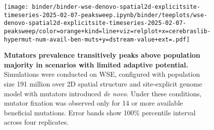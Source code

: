 \begin{figure}

\begin{minipage}{0.4\textwidth}
\texttt{[image: binder/binder-wse-denovo-spatial2d-explicitsite-timeseries-2025-02-07-peaksweep.ipynb/binder/teeplots/wse-denovo-spatial2d-explicitsite-timeseries-2025-02-07-peaksweep/color=orange+kind=line+viz=relplot+x=cerebraslib-hypermut-num-avail-ben-muts+y=dstream-value+ext=.pdf]}
\end{minipage}
\begin{minipage}{0.55\textwidth}
\caption{
\textbf{Mutators prevalence transitively peaks above population majority in scenarios with limited adaptive potential.}
\footnotesize
Simulations were conducted on WSE, configured with population size 191 million over 2D spatial structure and site-explicit genome model with mutators introduced \textit{de novo}.
Under these conditions, mutator fixation was observed only for 14 or more available beneficial mutations.
Error bands show 100\% percentile interval across four replicates.
}
\label{fig:peaksweep}
\end{minipage}
\end{figure}
